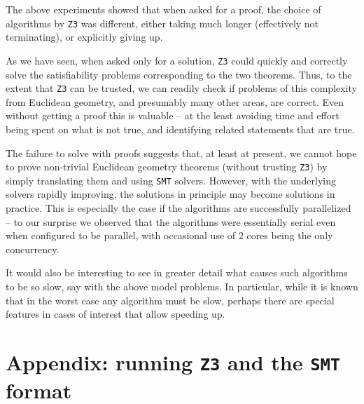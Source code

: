 \documentclass{amsart}
\theoremstyle{plain}
\theoremstyle{definition}
\theoremstyle{remark}
\begin{document}
The above experiments showed that when asked for a proof, the choice of algorithms by \texttt{Z3}
was different, either taking much longer (effectively not terminating),
or explicitly giving up.

As we have seen, when asked only for a solution, \texttt{Z3} could quickly and correctly solve the
satisfiability problems corresponding to the two theorems.
Thus, to the extent that \texttt{Z3} can be trusted, we can readily check if
problems of this complexity from Euclidean geometry, and presumably many
other areas, are correct. Even without getting a proof this is valuable
-- at the least avoiding time and effort being spent on what is not
true, and identifying related statements that are true.

The failure to solve with proofs suggests that, at least at present, we cannot hope to
prove non-trivial Euclidean geometry theorems (without trusting \texttt{Z3}) by simply translating
them and using \texttt{SMT} solvers. However, with the underlying solvers rapidly
improving, the solutions in principle may become solutions in practice.
This is especially the case if the algorithms are successfully
parallelized -- to our surprise we observed that the algorithms were
essentially serial even when configured to be parallel, with occasional
use of \(2\) cores being the only concurrency.

It would also be interesting to see in greater detail what causes such
algorithms to be so slow, say with the above model problems. In
particular, while it is known that in the worst case any algorithm must
be slow, perhaps there are special features in cases of interest that
allow speeding up.

\section*{Appendix: running \texttt{Z3} and the \texttt{SMT} format}
\end{document}
